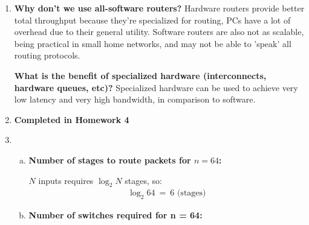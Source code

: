 \documentclass[11pt]{article}
\begin{document}
\begin{enumerate}[1.]
\item %
  \textbf{
    Why don't we use all-software routers?
  }
  Hardware routers provide better total throughput because they're specialized for routing, PCs have a lot of overhead due to their general utility. Software routers are also not as scalable, being practical in small home networks, and may not be able to 'speak' all routing protocols.

  \textbf{
    What is the benefit of specialized hardware (interconnects, hardware queues, etc)?
  }
  Specialized hardware can be used to achieve very low latency and very high bandwidth, in comparison to software.
  
\item %
  \textbf{
    Completed in Homework 4
  }
\item %
  \begin{enumerate}[(a)]
  \item 
    \textbf{
      Number of stages to route packets for $n = 64$:
    }

    $N$ inputs requires $\log_2N$ stages, so:
    \begin{align*}
      \log_2 64 \ =\ 6 \text{ (stages)} 
    \end{align*}

  \item
    \textbf{
      Number of switches required for n = 64:
    }


\end{enumerate}
\end{enumerate}
\end{document}
